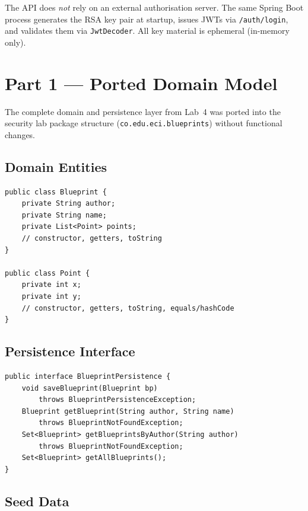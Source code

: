 \documentclass[10pt,a4paper,twocolumn]{article}
\begin{document}
\begin{warningbox}
The API does \emph{not} rely on an external authorisation server. The same
Spring Boot process generates the RSA key pair at startup, issues JWTs via
\texttt{/auth/login}, and validates them via \texttt{JwtDecoder}.
All key material is ephemeral (in-memory only).
\end{warningbox}

\section{Part 1 --- Ported Domain Model}

The complete domain and persistence layer from Lab~4 was ported into the
security lab package structure (\texttt{co.edu.eci.blueprints}) without
functional changes.

\subsection{Domain Entities}

\begin{lstlisting}[style=javacode, caption={Blueprint and Point records}]
public class Blueprint {
    private String author;
    private String name;
    private List<Point> points;
    // constructor, getters, toString
}

public class Point {
    private int x;
    private int y;
    // constructor, getters, toString, equals/hashCode
}
\end{lstlisting}

\subsection{Persistence Interface}

\begin{lstlisting}[style=javacode, caption={BlueprintPersistence interface}]
public interface BlueprintPersistence {
    void saveBlueprint(Blueprint bp)
        throws BlueprintPersistenceException;
    Blueprint getBlueprint(String author, String name)
        throws BlueprintNotFoundException;
    Set<Blueprint> getBlueprintsByAuthor(String author)
        throws BlueprintNotFoundException;
    Set<Blueprint> getAllBlueprints();
}
\end{lstlisting}

\subsection{Seed Data}
\end{document}
